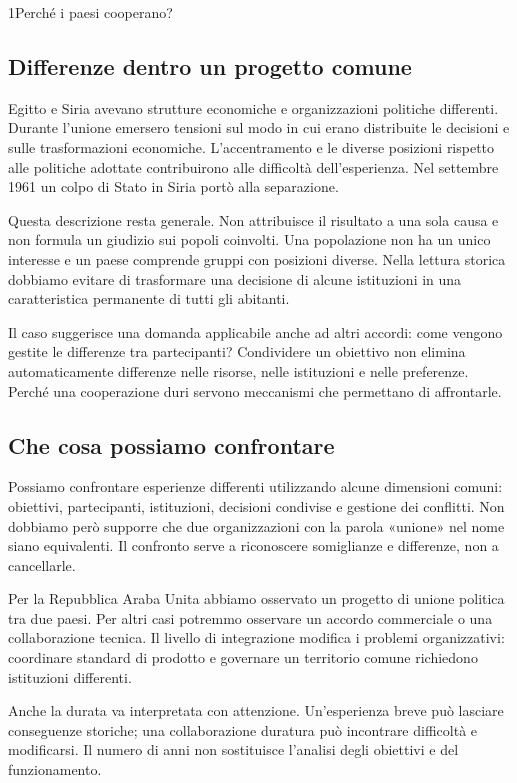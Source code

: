 \begin{lettura}{1}{Perché i paesi cooperano?}
\subsection*{Differenze dentro un progetto comune}
Egitto e Siria avevano strutture economiche e organizzazioni politiche differenti. Durante l'unione emersero tensioni sul modo in cui erano distribuite le decisioni e sulle trasformazioni economiche. L'accentramento e le diverse posizioni rispetto alle politiche adottate contribuirono alle difficoltà dell'esperienza. Nel settembre 1961 un colpo di Stato in Siria portò alla separazione.

Questa descrizione resta generale. Non attribuisce il risultato a una sola causa e non formula un giudizio sui popoli coinvolti. Una popolazione non ha un unico interesse e un paese comprende gruppi con posizioni diverse. Nella lettura storica dobbiamo evitare di trasformare una decisione di alcune istituzioni in una caratteristica permanente di tutti gli abitanti.

Il caso suggerisce una domanda applicabile anche ad altri accordi: come vengono gestite le differenze tra partecipanti? Condividere un obiettivo non elimina automaticamente differenze nelle risorse, nelle istituzioni e nelle preferenze. Perché una cooperazione duri servono meccanismi che permettano di affrontarle.

\subsection*{Che cosa possiamo confrontare}
Possiamo confrontare esperienze differenti utilizzando alcune dimensioni comuni: obiettivi, partecipanti, istituzioni, decisioni condivise e gestione dei conflitti. Non dobbiamo però supporre che due organizzazioni con la parola «unione» nel nome siano equivalenti. Il confronto serve a riconoscere somiglianze e differenze, non a cancellarle.

Per la Repubblica Araba Unita abbiamo osservato un progetto di unione politica tra due paesi. Per altri casi potremmo osservare un accordo commerciale o una collaborazione tecnica. Il livello di integrazione modifica i problemi organizzativi: coordinare standard di prodotto e governare un territorio comune richiedono istituzioni differenti.

Anche la durata va interpretata con attenzione. Un'esperienza breve può lasciare conseguenze storiche; una collaborazione duratura può incontrare difficoltà e modificarsi. Il numero di anni non sostituisce l'analisi degli obiettivi e del funzionamento.


\end{lettura}
